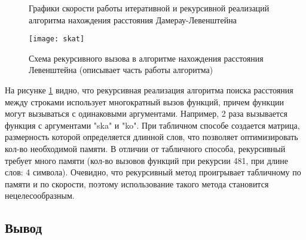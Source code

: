 \documentclass[a4paper, 14pt]{article}
\begin{document}
	\begin{figure}[H]
	\caption{Графики скорости работы итеративной и рекурсивной реализаций алгоритма нахождения расстояния Дамерау-Левенштейна}
	\end{figure}
	
		\begin{figure}[H]
        	\begin{center}
        		{\texttt{[image: skat]}}
        		\caption{Схема рекурсивного вызова в алгоритме нахождения расстояния Левенштейна (описывает часть работы алгоритма)}
        		\label{skat}
        	\end{center}
        \end{figure}
	
	На рисунке \ref{skat} видно, что рекурсивная реализация алгоритма поиска расстояния между строками использует многократный вызов функций, причем функции могут вызываться с одинаковыми аргументами. Например, 2 раза вызывается функция с аргументами "ska" и "ko". При табличном способе создается матрица, размерность которой определяется длинной слов, что позволяет оптимизировать кол-во необходимой памяти. В отличии от табличного способа, рекурсивный требует много памяти (кол-во вызовов функций при рекурсии 481, при длине слов: 4 символа). Очевидно, что рекурсивный метод проигрывает табличному по памяти и по скорости, поэтому использование такого метода становится нецелесообразным. 
	
	\subsection{Вывод}
	
\end{document}
